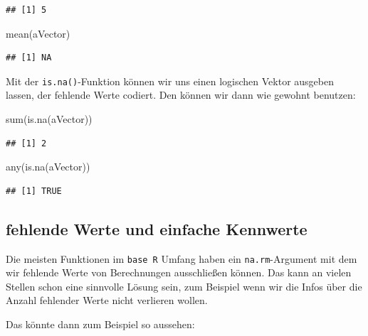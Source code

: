 \documentclass[
]{book}
\newenvironment{Shaded}{\begin{snugshade}}{\end{snugshade}}
\newcommand{\FunctionTok}[1]{\textcolor[rgb]{0.00,0.00,0.00}{#1}}
\newcommand{\NormalTok}[1]{#1}
\begin{document}
\begin{verbatim}
## [1] 5
\end{verbatim}

\begin{Shaded}
\begin{Highlighting}[]
\FunctionTok{mean}\NormalTok{(aVector)}
\end{Highlighting}
\end{Shaded}

\begin{verbatim}
## [1] NA
\end{verbatim}

Mit der \texttt{is.na()}-Funktion können wir uns einen logischen Vektor ausgeben lassen, der fehlende Werte codiert. Den können wir dann wie gewohnt benutzen:

\begin{Shaded}
\begin{Highlighting}[]
\FunctionTok{sum}\NormalTok{(}\FunctionTok{is.na}\NormalTok{(aVector))}
\end{Highlighting}
\end{Shaded}

\begin{verbatim}
## [1] 2
\end{verbatim}

\begin{Shaded}
\begin{Highlighting}[]
\FunctionTok{any}\NormalTok{(}\FunctionTok{is.na}\NormalTok{(aVector))}
\end{Highlighting}
\end{Shaded}

\begin{verbatim}
## [1] TRUE
\end{verbatim}

\hypertarget{fehlende-werte-und-einfache-kennwerte}{%
\subsection{fehlende Werte und einfache Kennwerte}\label{fehlende-werte-und-einfache-kennwerte}}

Die meisten Funktionen im \texttt{base\ R} Umfang haben ein \texttt{na.rm}-Argument mit dem wir fehlende Werte von Berechnungen ausschließen können. Das kann an vielen Stellen schon eine sinnvolle Lösung sein, zum Beispiel wenn wir die Infos über die Anzahl fehlender Werte nicht verlieren wollen.

Das könnte dann zum Beispiel so aussehen:
\end{document}
